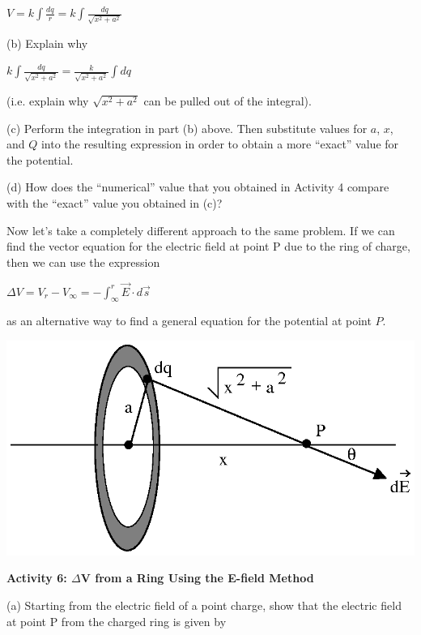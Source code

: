 {\centering \( V=k\int \frac{dq}{r}=k\int \frac{dq}{\sqrt{x^{2}+a^{2}}} \)\par}
\answerspace{20mm}

(b) Explain why

{\centering \( k\int \frac{dq}{\sqrt{x^{2}+a^{2}}}=\frac{k}{\sqrt{x^{2}+a^{2}}}\int dq \)\par}

(i.e. explain why \( \sqrt{x^{2}+a^{2}} \) can be pulled out of the integral).
\answerspace{20mm}

(c) Perform the integration in part (b) above. Then substitute values
for $a$, $x$, and $Q$ into the resulting expression in order to obtain a
more {}``exact'' value for the potential.
\answerspace{25mm}

(d) How does the {}``numerical'' value that you obtained in Activity
4 compare with the {}``exact'' value you obtained in (c)?
\answerspace{10mm}

\pagebreak[2]
Now let's take a completely different approach to the same problem.
If we can find the vector equation for the electric field at point
P due to the ring of charge, then we can use the expression

{\centering \( \Delta V=V_{r}-V_{\infty }=-\int ^{r}_{\infty }\overrightarrow{E}\cdot d\overrightarrow{s} \)\par}

as an alternative way to find a general equation for the potential
at point $P$.

\answerspace{0.3cm}
{\centering \includegraphics[scale=0.8]{electric_potential/electric_potential_fig_6.eps} \par}
\answerspace{0.3cm}

\textbf{Activity 6: \( \Delta  \)V from a Ring Using the E-field
Method}

(a) Starting from the electric field of a point charge, show that
the electric field at point P from the charged ring is given by

